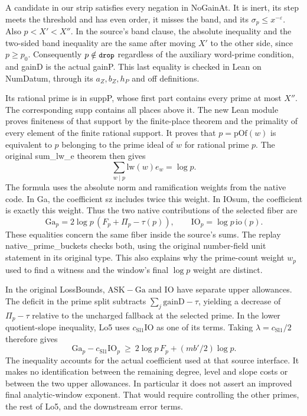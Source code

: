 \documentclass[12pt,letterpaper]{article}
\DeclareRobustCommand{\id}[1]{\mbox{\small\ttfamily #1}}
\begin{document}
A candidate in our strip satisfies every negation in \id{NoGainAt}. It is inert, its step meets the threshold and has even order, it misses the band, and its \(\sigma_p\le x^{-\varepsilon}\). Also \(p<X'<X''\). In the source's band clause, the absolute inequality and the two-sided band inequality are the same after moving \(X'\) to the other side, since \(p\ge p_0\). Consequently \(p\notin\id{drop}\) regardless of the auxiliary word-prime condition, and \id{gainD} is the actual \id{gainP}. This last equality is checked in Lean on \id{NumDatum}, through its \(a_Z,b_Z,h_P\) and \id{off} definitions.

Its rational prime is in \id{suppP}, whose first part contains every prime at most \(X''\). The corresponding \id{supp} contains all places above it. The new Lean module proves finiteness of that support by the finite-place theorem and the primality of every element of the finite rational support. It proves that \(p=\mathrm{pOf}(w)\) is equivalent to \(p\) belonging to the prime ideal of \(w\) for rational prime \(p\). The original \id{sum\_lw\_e} theorem then gives
\[
                  \sum_{w\mid p} \mathrm{lw}(w)e_w=\log p .
\]
The formula uses the absolute norm and ramification weights from the native code. In \id{Ga}, the coefficient \id{sz} includes twice this weight. In \id{IOsum}, the coefficient is exactly this weight. Thus the two native contributions of the selected fiber are
\[
        \mathrm{Ga}_p=2\log p\,(F_p+\Pi_p-\tau(p)),
     \qquad
        \mathrm{IO}_p=\log p\,\mathrm{io}(p).
\]
These equalities concern the same fiber inside the source's sums. The replay \id{native\_prime\_buckets} checks both, using the original number-field unit statement in its original type. This also explains why the prime-count weight \(w_p\) used to find a witness and the window's final \(\log p\) weight are distinct.

In the original \id{LossBounds}, \(\mathrm{ASK}-\mathrm{Ga}\) and \(\mathrm{IO}\) have separate upper allowances. The \id{deficit} in the prime split subtracts \(\sum_j\mathrm{gainD}-\tau\), yielding a decrease of \(\Pi_p-\tau\) relative to the uncharged fallback at the selected prime. In the lower quotient-slope inequality, \id{Lo5} uses \(c_{\mathrm{Sl1}}\mathrm{IO}\) as one of its terms. Taking \(\lambda=c_{\mathrm{Sl1}}/2\) therefore gives
\[
      \mathrm{Ga}_p-c_{\mathrm{Sl1}}\mathrm{IO}_p
                     \ \ge\ 2\log p\,F_p+(m b'/2)\log p .
\]
The inequality accounts for the actual coefficient used at that source interface. It makes no identification between the remaining degree, level and slope costs or between the two upper allowances. In particular it does not assert an improved final analytic-window exponent. That would require controlling the other primes, the rest of \id{Lo5}, and the downstream error terms.
\end{document}

